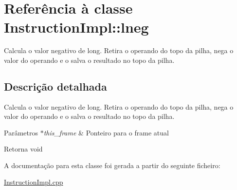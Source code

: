 \hypertarget{class_instruction_impl_1_1lneg}{}\section{Referência à classe Instruction\+Impl\+:\+:lneg}
\label{class_instruction_impl_1_1lneg}


Calcula o valor negativo de long. Retira o operando do topo da pilha, nega o valor do operando e o salva o resultado no topo da pilha.  




\subsection{Descrição detalhada}
Calcula o valor negativo de long. Retira o operando do topo da pilha, nega o valor do operando e o salva o resultado no topo da pilha. 


\begin{DoxyParams}{Parâmetros}
{\em $\ast$this\+\_\+frame} & Ponteiro para o frame atual \\
\hline
\end{DoxyParams}
\begin{DoxyReturn}{Retorna}
void 
\end{DoxyReturn}


A documentação para esta classe foi gerada a partir do seguinte ficheiro\+:\begin{DoxyCompactItemize}
\item 
\hyperlink{_instruction_impl_8cpp}{Instruction\+Impl.\+cpp}\end{DoxyCompactItemize}
